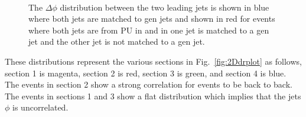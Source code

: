 \begin{figure}[!hbtp]
\centering
{}
\\
\caption{The $\Delta\phi$ distribution between the two leading jets is shown in blue where both jets are matched to gen jets and shown in red for events where both jets are from PU in  and in  one jet is matched to a gen jet and the other jet is not matched to a gen jet.}
\label{fig:dphiplots}
\end{figure}

These distributions represent the various sections in Fig.~\ref{fig:2Ddrplot} as follows, section 1 is magenta, section 2 is red, section 3 is green, and section 4 is blue. 
The events in section 2 show a strong correlation for events to be back to back. The events in sections 1 and 3 show a flat distribution which implies that the jets $\phi$ is uncorrelated. 

\clearpage
